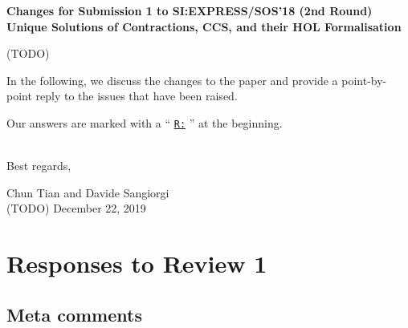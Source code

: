 \newcommand{\Mark}{{\underline{\tt R:} }}


\begin{center}
\textbf{
{\small Changes for Submission 1 to SI:EXPRESS/SOS'18 (2nd Round)}\\[5mm]
{\large Unique Solutions of Contractions, CCS, and their HOL
  Formalisation
}}
\end{center}



\vskip 10pt
\noindent

(TODO)


In the following, we discuss the changes to the paper and provide a
point-by-point reply to the issues that have been raised.

Our answers are marked  with a `` \Mark''  at the beginning.

\ \\

Best regards,
\begin{flushright}
  Chun Tian and Davide Sangiorgi \\
  (TODO) December 22, 2019
\end{flushright}

\vspace{1cm}

\section*{Responses to Review 1}

\subsection*{Meta comments}

